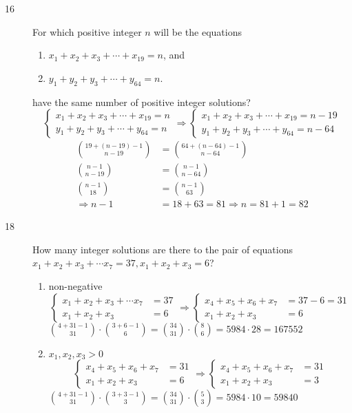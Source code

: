 \documentclass[a4paper]{article}
\begin{document}
\begin{description}
\item[16]
For which positive integer $n$ will be the equations
\begin{enumerate}[label=(\arabic*)]
    \item $x_1+x_2+x_3+\cdots+x_{19}=n$, and
    \item $y_1+y_2+y_3+\cdots+y_{64}=n$.
\end{enumerate}
have the same number of positive integer solutions?
    \begin{equation*}
    \begin{cases}
    x_1+x_2+x_3+\cdots+x_{19}=n\\
    y_1+y_2+y_3+\cdots+y_{64}=n
    \end{cases}
    \Rightarrow
    \begin{cases}
    x_1+x_2+x_3+\cdots+x_{19}=n-19\\
    y_1+y_2+y_3+\cdots+y_{64}=n-64
    \end{cases}
    \end{equation*}
    \begin{align*}
        \binom{19+(n-19)-1}{n-19} & = \binom{64+(n-64)-1}{n-64} \\
        \binom{n-1}{n-19} & = \binom{n-1}{n-64} \\
        \binom{n-1}{18} & = \binom{n-1}{63} \\
        \Rightarrow n-1 & = 18+63=81\Rightarrow n=81+1=82
    \end{align*}
\item[18]
How many integer solutions are there to the pair of equations $x_1+x_2+x_3+\cdots x_7=37,x_1+x_2+x_3=6$?
    \begin{enumerate}[label=\alph*)]
    \item non-negative
    \begin{equation*}
    \begin{cases}
    x_1+x_2+x_3+\cdots x_7&=37\\
    x_1+x_2+x_3&=6
    \end{cases}
    \Rightarrow
    \begin{cases}
    x_4+x_5+x_6+x_{7}&=37-6=31\\
    x_1+x_2+x_3&=6
    \end{cases}
    \end{equation*}
      $ \binom{4+31-1}{31}\cdot\binom{3+6-1}{6}=\binom{34}{31}\cdot\binom{8}{6}=5984\cdot 28=167552$
      \item $x_1,x_2,x_3>0$
     \begin{equation*}
    \begin{cases}
    x_4+x_5+x_6+x_{7}&=31\\
    x_1+x_2+x_3&=6
    \end{cases}
    \Rightarrow
    \begin{cases}
    x_4+x_5+x_6+x_7&=31\\
    x_1+x_2+x_3&=3
    \end{cases}
    \end{equation*}
      $\binom{4+31-1}{31}\cdot\binom{3+3-1}{3}=\binom{34}{31}\cdot\binom{5}{3}=5984\cdot 10=59840$
    \end{enumerate}
\end{description}
\end{document}
